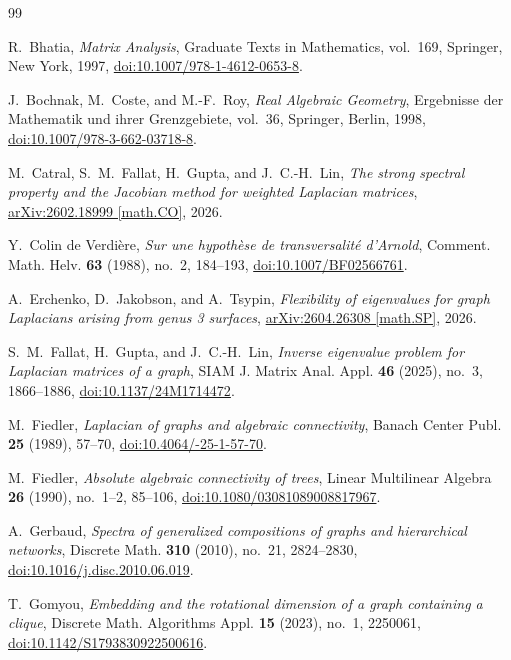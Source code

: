 \documentclass[11pt,reqno]{amsart}
\theoremstyle{definition}
\theoremstyle{remark}
\begin{document}
\begin{thebibliography}{99}

R.~Bhatia,
\emph{Matrix Analysis},
Graduate Texts in Mathematics, vol.~169,
Springer, New York, 1997,
\href{https://doi.org/10.1007/978-1-4612-0653-8}
{doi:10.1007/978-1-4612-0653-8}.

J.~Bochnak, M.~Coste, and M.-F.~Roy,
\emph{Real Algebraic Geometry},
Ergebnisse der Mathematik und ihrer Grenzgebiete, vol.~36,
Springer, Berlin, 1998,
\href{https://doi.org/10.1007/978-3-662-03718-8}{doi:10.1007/978-3-662-03718-8}.

M.~Catral, S.~M.~Fallat, H.~Gupta, and J.~C.-H.~Lin,
\emph{The strong spectral property and the Jacobian method for weighted
Laplacian matrices},
\href{https://arxiv.org/abs/2602.18999}{arXiv:2602.18999 [math.CO]}, 2026.

Y.~Colin de Verdi\`ere,
\emph{Sur une hypoth\`ese de transversalit\'e d'Arnold},
Comment. Math. Helv. \textbf{63} (1988), no.~2, 184--193,
\href{https://doi.org/10.1007/BF02566761}{doi:10.1007/BF02566761}.

A.~Erchenko, D.~Jakobson, and A.~Tsypin,
\emph{Flexibility of eigenvalues for graph Laplacians arising from genus 3
surfaces},
\href{https://arxiv.org/abs/2604.26308}{arXiv:2604.26308 [math.SP]}, 2026.

S.~M.~Fallat, H.~Gupta, and J.~C.-H.~Lin,
\emph{Inverse eigenvalue problem for Laplacian matrices of a graph},
SIAM J. Matrix Anal. Appl. \textbf{46} (2025), no.~3, 1866--1886,
\href{https://doi.org/10.1137/24M1714472}{doi:10.1137/24M1714472}.

M.~Fiedler,
\emph{Laplacian of graphs and algebraic connectivity},
Banach Center Publ. \textbf{25} (1989), 57--70,
\href{https://doi.org/10.4064/-25-1-57-70}
{doi:10.4064/-25-1-57-70}.

M.~Fiedler,
\emph{Absolute algebraic connectivity of trees},
Linear Multilinear Algebra \textbf{26} (1990), no.~1--2, 85--106,
\href{https://doi.org/10.1080/03081089008817967}{doi:10.1080/03081089008817967}.

A.~Gerbaud,
\emph{Spectra of generalized compositions of graphs and hierarchical
networks},
Discrete Math. \textbf{310} (2010), no.~21, 2824--2830,
\href{https://doi.org/10.1016/j.disc.2010.06.019}{doi:10.1016/j.disc.2010.06.019}.

T.~Gomyou,
\emph{Embedding and the rotational dimension of a graph containing a clique},
Discrete Math. Algorithms Appl. \textbf{15} (2023), no.~1, 2250061,
\href{https://doi.org/10.1142/S1793830922500616}{doi:10.1142/S1793830922500616}.


\end{thebibliography}
\end{document}

